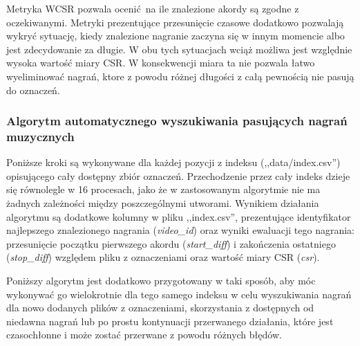 Metryka WCSR pozwala ocenić na ile znalezione akordy są zgodne z oczekiwanymi. Metryki prezentujące
przesunięcie czasowe dodatkowo pozwalają wykryć sytuację, kiedy znalezione nagranie zaczyna się w
innym momencie albo jest zdecydowanie za długie. W obu tych sytuacjach wciąż możliwa jest względnie
wysoka wartość miary CSR. W konsekwencji miara ta nie pozwala łatwo wyeliminować nagrań, ktore z
powodu różnej długości z całą pewnością nie pasują do oznaczeń.

\subsubsection{Algorytm automatycznego wyszukiwania pasujących nagrań muzycznych}

Poniższe kroki są wykonywane dla każdej pozycji z indeksu (,,data/index.csv'') opisującego cały
dostępny zbiór oznaczeń. Przechodzenie przez cały indeks dzieje się równolegle w 16 procesach, jako
że w zastosowanym algorytmie nie ma żadnych zależności między poszczególnymi utworami. Wynikiem
działania algorytmu są dodatkowe kolumny w pliku ,,index.csv'', prezentujące identyfikator
najlepszego znalezionego nagrania (\emph{video\_id}) oraz wyniki ewaluacji tego nagrania:
przesunięcie początku pierwszego akordu (\emph{start\_diff}) i zakończenia ostatniego
(\emph{stop\_diff}) względem pliku z oznaczeniami oraz wartość miary CSR (\emph{csr}).

Poniższy algorytm jest dodatkowo przygotowany w taki sposób, aby móc wykonywać go wielokrotnie dla
tego samego indeksu w celu wyszukiwania nagrań dla nowo dodanych plików z oznaczeniami, skorzystania
z dostępnych od niedawna nagrań lub po prostu kontynuacji przerwanego działania, które jest
czasochłonne i może zostać przerwane z powodu różnych błędów.

